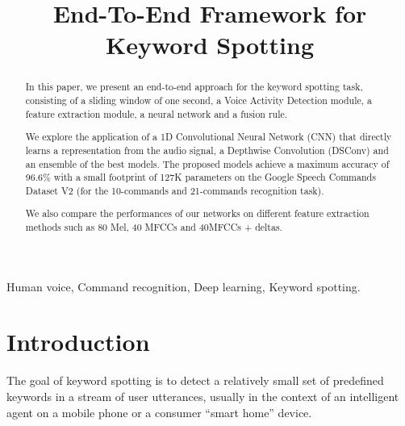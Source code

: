\documentclass[conference]{IEEEtran}
\begin{document}
\title{End-To-End Framework for Keyword Spotting}
\author{
\and
{}
}

\maketitle

\begin{abstract}
In this paper, we present an end-to-end approach for the keyword spotting task, consisting of a sliding window of one second, a Voice Activity Detection module, a feature extraction module, a neural network and a fusion rule.

We explore the application of a 1D Convolutional Neural Network (CNN) that directly learns a representation from the audio signal, a Depthwise Convolution (DSConv) and an ensemble of the best models.
The proposed models achieve a maximum accuracy of 96.6\% with a small footprint of 127K parameters on the Google Speech Commands Dataset V2 (for the 10-commands and 21-commands recognition task).

We also compare the performances of our networks on different feature extraction methods such as 80 Mel, 40 MFCCs and 40MFCCs + deltas.
\end{abstract}

\IEEEpeerreviewmaketitle
\begin{IEEEkeywords}
Human voice, Command recognition, Deep learning, Keyword spotting.
\end{IEEEkeywords}

\section{Introduction}
The goal of keyword spotting is to detect a relatively small set of predefined keywords in a stream of user utterances, usually in the context of an intelligent agent on a mobile phone or a consumer “smart home” device.
\end{document}
